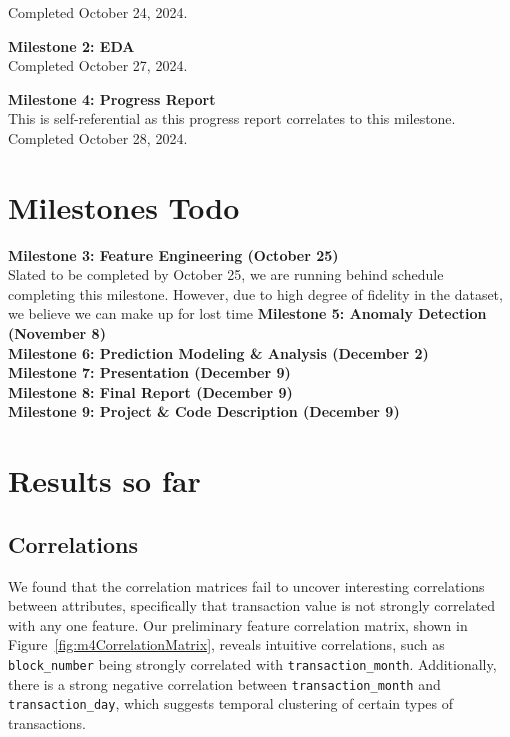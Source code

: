 \documentclass[sigconf]{acmart}
\begin{document}
Completed October 24, 2024.

\textbf{Milestone 2: EDA}\\
Completed October 27, 2024.

\textbf{Milestone 4: Progress Report}\\
This is self-referential as this progress report correlates to this milestone. Completed October 28, 2024.

\section{Milestones Todo}
\textbf{Milestone 3: Feature Engineering (October 25)}\\
Slated to be completed by October 25, we are running behind schedule completing this milestone. However, due to high degree of fidelity in the dataset, we believe we can make up for lost time
\textbf{Milestone 5: Anomaly Detection (November 8)}\\
\textbf{Milestone 6: Prediction Modeling \& Analysis (December 2)}\\
\textbf{Milestone 7: Presentation (December 9)}\\
\textbf{Milestone 8: Final Report (December 9)}\\
\textbf{Milestone 9: Project \& Code Description (December 9)}\\

\section{Results so far}
\subsection{Correlations}
We found that the correlation matrices fail to uncover interesting correlations between attributes, specifically that transaction value is not strongly correlated with any one feature. Our preliminary feature correlation matrix, shown in Figure~\ref{fig:m4CorrelationMatrix}, reveals intuitive correlations, such as \texttt{block\_number} being strongly correlated with \texttt{transaction\_month}. Additionally, there is a strong negative correlation between \texttt{transaction\_month} and \texttt{transaction\_day}, which suggests temporal clustering of certain types of transactions.
\end{document}

